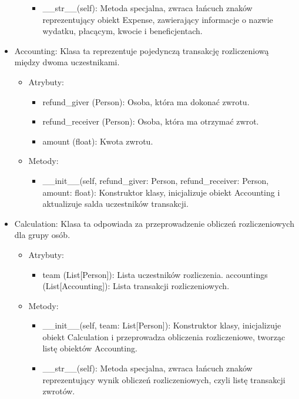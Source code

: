 \documentclass{article}
\begin{document}
\begin{itemize}
\begin{itemize}
\begin{itemize}
\item \_\_str\_\_(self): Metoda specjalna, zwraca łańcuch znaków reprezentujący obiekt Expense, zawierający informacje o nazwie wydatku, płacącym, kwocie i beneficjentach.
\end{itemize}
\end{itemize}
\item Accounting: Klasa ta reprezentuje pojedynczą transakcję rozliczeniową między dwoma uczestnikami.
\begin{itemize}
\item Atrybuty:
\begin{itemize}
\item refund\_giver (Person): Osoba, która ma dokonać zwrotu.
\item refund\_receiver (Person): Osoba, która ma otrzymać zwrot.
\item amount (float): Kwota zwrotu.
\end{itemize}
\item Metody:
\begin{itemize}
\item \_\_init\_\_(self, refund\_giver: Person, refund\_receiver: Person, amount: float): Konstruktor klasy, inicjalizuje obiekt Accounting i aktualizuje salda uczestników transakcji.
\end{itemize}
\end{itemize}
\item Calculation: Klasa ta odpowiada za przeprowadzenie obliczeń rozliczeniowych dla grupy osób.
\begin{itemize}
\item Atrybuty:
\begin{itemize}
\item team (List[Person]): Lista uczestników rozliczenia.
accountings (List[Accounting]): Lista transakcji rozliczeniowych.
\end{itemize}
\item Metody:
\begin{itemize}
\item \_\_init\_\_(self, team: List[Person]): Konstruktor klasy, inicjalizuje obiekt Calculation i przeprowadza obliczenia rozliczeniowe, tworząc listę obiektów Accounting.
\item \_\_str\_\_(self): Metoda specjalna, zwraca łańcuch znaków reprezentujący wynik obliczeń rozliczeniowych, czyli listę transakcji zwrotów.
\end{itemize}
\end{itemize}
\end{itemize}
\end{document}

